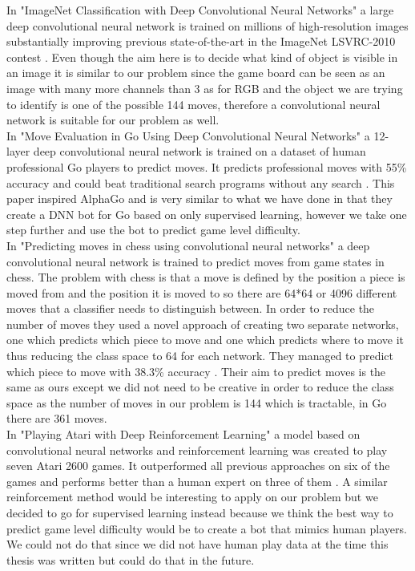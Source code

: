 \documentclass{kththesis}
\begin{document}
In "ImageNet Classification with Deep Convolutional Neural Networks" a large deep convolutional neural network is trained on millions of high-resolution images substantially improving previous state-of-the-art in the ImageNet LSVRC-2010 contest \cite{krizhevsky2012imagenet}. Even though the aim here is to decide what kind of object is visible in an image it is similar to our problem since the game board can be seen as an image with many more channels than 3 as for RGB and the object we are trying to identify is one of the possible 144 moves, therefore a convolutional neural network is suitable for our problem as well. \\

In "Move Evaluation in Go Using Deep Convolutional Neural Networks" a 12-layer deep convolutional neural network  is trained on a dataset of human professional Go players  to predict moves. It predicts professional moves with 55\% accuracy  and could beat traditional search programs without any search \cite{goMoveEvaluation2014}. This paper inspired AlphaGo and is very similar to what we have done in that they create a DNN bot for Go based on only supervised learning, however we take one step further and use the bot to predict game level difficulty.\\

In "Predicting moves in chess using convolutional neural networks" a deep convolutional neural network is trained to predict moves from game states in chess. The problem with chess is that a move is defined by the position a piece is moved from and the position it is moved to so there are 64*64 or 4096 different moves that a classifier needs to distinguish between. In order to reduce the number of moves they used a novel approach of creating two separate networks, one which predicts which piece to move and one which predicts where to move it thus reducing the class space to 64 for each network. They managed to predict which piece to move with 38.3\% accuracy \cite{oshripredicting}. Their aim to predict moves is the same as ours except we did not need to be creative in order to reduce the class space as the number of moves in our problem is 144 which is tractable, in Go there are 361 moves. \\

In "Playing Atari with Deep Reinforcement Learning" a  model based on convolutional neural networks and reinforcement learning was created to play seven Atari 2600 games. It outperformed all previous approaches on six of the games  and  performs better than a human expert on three of them \cite{mnih2013playing}. A similar reinforcement method would be interesting to apply on our problem but we decided to go for supervised learning instead because we think the best way to predict game level difficulty would be to create a bot that mimics human players. We could not do that since we did not have human play data at the time this thesis was written but could do that in the future. \\
\end{document}
